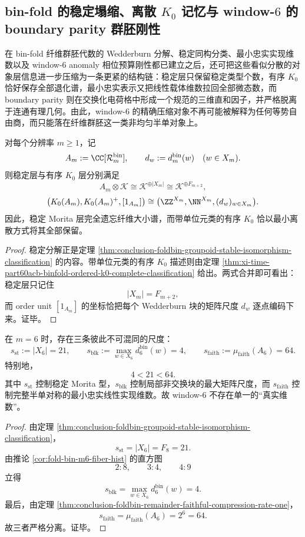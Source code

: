 \subsection{bin-fold 的稳定塌缩、离散 \texorpdfstring{$K_0$}{K0} 记忆与 window-\texorpdfstring{$6$}{6} 的 boundary parity 群胚刚性}\label{subsec:conclusion-foldbin-stable-k0-faithful-boundary-parity-groupoid}
在 bin-fold 纤维群胚代数的 Wedderburn 分解、稳定同构分类、最小忠实实现维数以及 window-\(6\) anomaly 相位预算刚性都已建立之后，还可把这些看似分散的对象层信息进一步压缩为一条更紧的结构链：稳定层只保留稳定类型个数，有序 \(K_0\) 恰好保存全部退化谱，最小忠实表示又把线性载体维数拉回全部微态数，而 boundary parity 则在交换化电荷格中形成一个规范的三维直和因子，并严格脱离于连通有理几何。由此，window-\(6\) 的精确压缩对象不再可能被解释为任何等势自由商，而只能落在纤维群胚这一类非均匀半单对象上。

\begin{theorem}[稳定塌缩后的最小离散记忆]\label{thm:conclusion-foldbin-stable-collapse-ordered-k0-memory}
对每个分辨率 \(m\ge 1\)，记
\[
A_m:=\CC[\mathcal R_m^{\mathrm{bin}}],
\qquad
d_w:=d_m^{\mathrm{bin}}(w)\quad (w\in X_m).
\]
则稳定层与有序 \(K_0\) 层分别满足
\[
A_m\otimes\mathcal K\cong \mathcal K^{\oplus |X_m|}\cong \mathcal K^{\oplus F_{m+2}},
\]
\[
\bigl(K_0(A_m),K_0(A_m)^+,[1_{A_m}]\bigr)
\cong
\bigl(\ZZ^{X_m},\NN^{X_m},(d_w)_{w\in X_m}\bigr).
\]
因此，稳定 Morita 层完全遗忘纤维大小谱，而带单位元类的有序 \(K_0\) 恰以最小离散方式将其全部保留。
\end{theorem}
\begin{proof}
稳定分解正是定理 \ref{thm:conclusion-foldbin-groupoid-stable-isomorphism-classification} 的内容。带单位元类的有序 \(K_0\) 描述则由定理 \ref{thm:xi-time-part60acb-binfold-ordered-k0-complete-classification} 给出。两式合并即可看出：稳定层只记住
\[
|X_m|=F_{m+2},
\]
而 order unit \([1_{A_m}]\) 的坐标恰把每个 Wedderburn 块的矩阵尺度 \(d_w\) 逐点编码下来。证毕。
\end{proof}

\begin{corollary}\label{cor:conclusion-window6-three-rigidity-scales}
在 \(m=6\) 时，存在三条彼此不可混同的尺度：
\[
s_{\mathrm{st}}:=|X_6|=21,
\qquad
s_{\mathrm{blk}}:=\max_{w\in X_6}d_6^{\mathrm{bin}}(w)=4,
\qquad
s_{\mathrm{faith}}:=\mu_{\mathrm{faith}}(A_6)=64.
\]
特别地，
\[
4<21<64.
\]
其中 \(s_{\mathrm{st}}\) 控制稳定 Morita 型，\(s_{\mathrm{blk}}\) 控制局部非交换块的最大矩阵尺度，而 \(s_{\mathrm{faith}}\) 控制完整半单对称的最小忠实线性实现维数。故 window-\(6\) 不存在单一的“真实维数”。
\end{corollary}
\begin{proof}
由定理 \ref{thm:conclusion-foldbin-groupoid-stable-isomorphism-classification}，
\[
s_{\mathrm{st}}=|X_6|=F_8=21.
\]
由推论 \ref{cor:fold-bin-m6-fiber-hist} 的直方图
\[
2:8,\qquad 3:4,\qquad 4:9
\]
立得
\[
s_{\mathrm{blk}}=\max_{w\in X_6}d_6^{\mathrm{bin}}(w)=4.
\]
最后，由定理 \ref{thm:conclusion-foldbin-remainder-faithful-compression-rate-one}，
\[
s_{\mathrm{faith}}=\mu_{\mathrm{faith}}(A_6)=2^6=64.
\]
故三者严格分离。证毕。
\end{proof}

